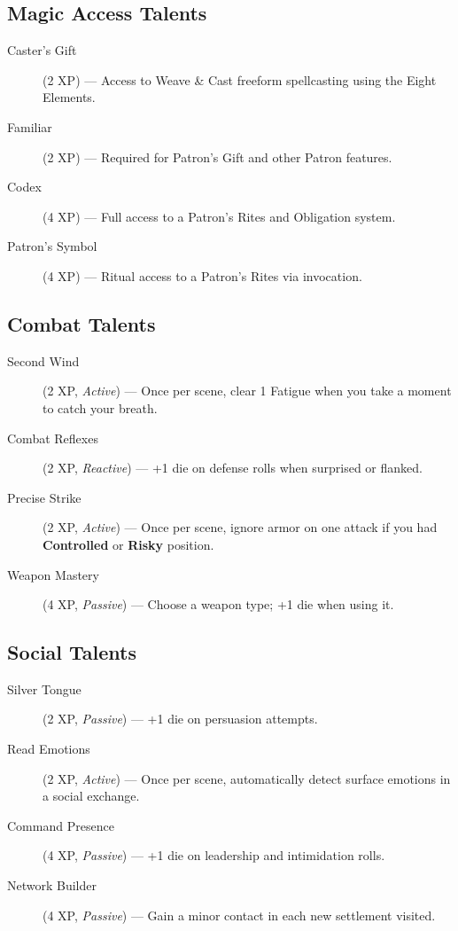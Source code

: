 \subsection*{Magic Access Talents}
\begin{description}
\item[Caster's Gift] (2 XP) --- Access to Weave \& Cast freeform spellcasting using the Eight Elements.
\item[Familiar] (2 XP) --- Required for Patron's Gift and other Patron features.
\item[Codex] (4 XP) --- Full access to a Patron's Rites and Obligation system.
\item[Patron's Symbol] (4 XP) --- Ritual access to a Patron's Rites via invocation.
\end{description}

\subsection*{Combat Talents}
\begin{description}
\item[Second Wind] (2 XP, \emph{Active}) --- Once per scene, clear 1 Fatigue when you take a moment to catch your breath.
\item[Combat Reflexes] (2 XP, \emph{Reactive}) --- +1 die on defense rolls when surprised or flanked.
\item[Precise Strike] (2 XP, \emph{Active}) --- Once per scene, ignore armor on one attack if you had \textbf{Controlled} or \textbf{Risky} position.
\item[Weapon Mastery] (4 XP, \emph{Passive}) --- Choose a weapon type; +1 die when using it.
\end{description}

\subsection*{Social Talents}
\begin{description}
\item[Silver Tongue] (2 XP, \emph{Passive}) --- +1 die on persuasion attempts.
\item[Read Emotions] (2 XP, \emph{Active}) --- Once per scene, automatically detect surface emotions in a social exchange.
\item[Command Presence] (4 XP, \emph{Passive}) --- +1 die on leadership and intimidation rolls.
\item[Network Builder] (4 XP, \emph{Passive}) --- Gain a minor contact in each new settlement visited.
\end{description}

